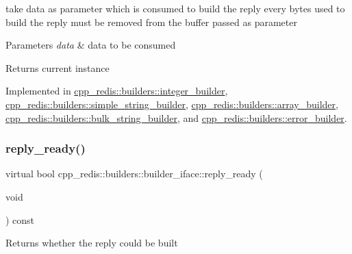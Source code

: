 take data as parameter which is consumed to build the reply every bytes used to build the reply must be removed from the buffer passed as parameter


\begin{DoxyParams}{Parameters}
{\em data} & data to be consumed \\
\hline
\end{DoxyParams}
\begin{DoxyReturn}{Returns}
current instance 
\end{DoxyReturn}


Implemented in \mbox{\hyperlink{classcpp__redis_1_1builders_1_1integer__builder_ae29f074134f7269db7f947b0fcbe312e}{cpp\+\_\+redis\+::builders\+::integer\+\_\+builder}}, \mbox{\hyperlink{classcpp__redis_1_1builders_1_1simple__string__builder_a159bb512f0427c4a988742f7cd01035e}{cpp\+\_\+redis\+::builders\+::simple\+\_\+string\+\_\+builder}}, \mbox{\hyperlink{classcpp__redis_1_1builders_1_1array__builder_a043357d0ef70406adef4df78c8d5307f}{cpp\+\_\+redis\+::builders\+::array\+\_\+builder}}, \mbox{\hyperlink{classcpp__redis_1_1builders_1_1bulk__string__builder_a43000357f87212f657aafe279a92b541}{cpp\+\_\+redis\+::builders\+::bulk\+\_\+string\+\_\+builder}}, and \mbox{\hyperlink{classcpp__redis_1_1builders_1_1error__builder_af5ac542be148d6f8500de79fa3164798}{cpp\+\_\+redis\+::builders\+::error\+\_\+builder}}.

\mbox{\label{classcpp__redis_1_1builders_1_1builder__iface_a40db9a31d4ea1771777e74146d31e12d}} 
\subsubsection{\texorpdfstring{reply\+\_\+ready()}{reply\_ready()}}
{\footnotesize\ttfamily virtual bool cpp\+\_\+redis\+::builders\+::builder\+\_\+iface\+::reply\+\_\+ready (\begin{DoxyParamCaption}\item[{void}]{ }\end{DoxyParamCaption}) const\hspace{0.3cm}{\ttfamily [pure virtual]}}

\begin{DoxyReturn}{Returns}
whether the reply could be built 
\end{DoxyReturn}


